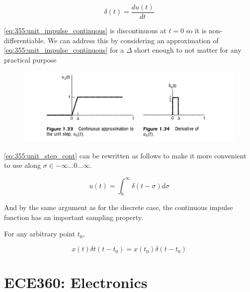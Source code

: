 \documentclass[10pt]{article}
\begin{document}
\begin{definition}
\begin{equation}
	\delta(t) = \frac{du(t)}{dt}
	\label{eq:355:unit_impulse_continuous}
\end{equation}
	
\end{definition}


\eqref{eq:355:unit_impulse_continuous} is discontinuous at $ t=0 $ so it is non-differentiable. We can address this by considering an approximation of \eqref{eq:355:unit_impulse_continuous} for a $ \Delta $ short enough to not matter for any practical purpose

\begin{figure}[H]
	\centering
	\includegraphics[width=0.8\linewidth]{img/image_2022-09-16-16-53-20.png}
\end{figure}


\eqref{eq:355:unit_step_cont} can be rewritten as follows to make it more convenient to use along $ \sigma\in-\infty\ldots 0\ldots\infty$. 

\begin{equation}
	u(t) = \int^{\infty}_0 \delta(t-\sigma) d\sigma
\end{equation}

\begin{theorem}
	
And by the same argument as for the discrete case, the continuous impulse function has an important sampling property.

	For any arbitrary point $ t_0 $,

	\begin{equation}
		x(t) \delta t(t-t_0) = x(t_0)\delta(t-t_0)
	\end{equation}

\end{theorem}







\part{ECE360: Electronics}
\end{document}
